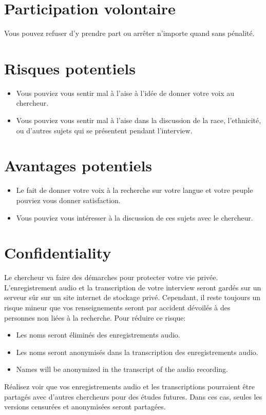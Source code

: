 \documentclass{article}
\begin{document}
    \section{Participation volontaire}
      Vous pouvez refuser d'y prendre part ou arrêter n'importe quand sans pénalité.

    \section{Risques potentiels}
       \begin{itemize}
         \item Vous pouviez vous sentir mal à l'aise à l'idée de donner votre voix au chercheur.
         \item Vous pouviez vous sentir mal à l'aise dans la discussion de la race, l'ethnicité, ou d'autres sujets qui se présentent pendant l'interview.
       \end{itemize}

    \section{Avantages potentiels}
      \begin{itemize}
        \item Le fait de donner votre voix à la recherche sur votre langue et votre peuple pouviez vous donner satisfaction.
        \item Vous pouviez vous intéresser à la discussion de ces sujets avec le chercheur.
      \end{itemize}

    \section{Confidentiality}
      Le chercheur va faire des démarches pour protecter votre vie privée.
      L'enregistrement audio et la transcription de votre interview seront gardés sur un serveur sûr sur un site internet de stockage privé.
      Cependant, il reste toujours un risque mineur que vos renseignements seront par accident dévoilés à des personnes non liées à la recherche.
      Pour réduire ce risque:
      \begin{itemize}
        \item Les noms seront éliminés des enregistrements audio.
        \item Les noms seront anonymisés dans la transcription des enregistrements audio.
        \item Names will be anonymized in the transcript of the audio recording.
      \end{itemize}
      Réalisez voir que vos enregistrements audio et les transcriptions pourraient être partagés avec d'autres chercheurs pour des études futures.
      Dans ces cas, seules les versions censurées et anonymisées seront partagées.
\end{document}
